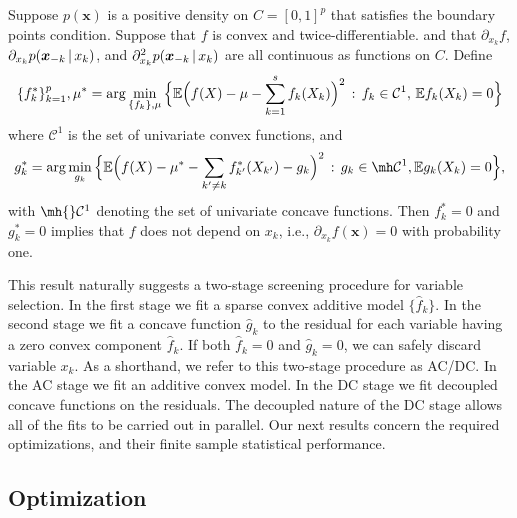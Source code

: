 \begin{stheorem}
Suppose $p(\mathbf{x})$ is a positive
density on $C=[0,1]^p$ that satisfies the boundary points
condition. Suppose that $f$ is convex and twice-differentiable.
and that $\partial_{x_k} f$, $\partial_{x_k} p( \mbox{\boldmath $x$}_{-k}
{\,|\,} x_k )$, and $\partial_{x_k}^2 p( \mbox{\boldmath $x$}_{-k} {\,|\,} x_k)$
are all continuous as functions on $C$.
Define
\begin{equation}
\{ f^*_k \}_{k=1}^p,\mu^* = \arg\min_{\{f_k\},\mu} \Big \{
{\mathbb E}\Bigl( f(X) - \mu - \sum_{k=1}^s f_k(X_k) \Bigr)^2 \,:\, f_k \in
\mathcal{C}^1, \, {\mathbb E} f_k(X_k) = 0 \Big \}
\end{equation} where $\mathcal{C}^1$ is the set of univariate convex
functions, and
\begin{equation}
g^*_k = \arg\min_{g_k} \Big\{ \E\Bigl( f(X) - \mu^* - 
\sum_{k' \neq k} f^*_{k'}(X_{k'}) - g_k \Bigr)^2 \,:\, g_k \in \mh
\mathcal{C}^1, \E g_k(X_k) = 0 \Big\},
\end{equation}
with $\mh{}\mathcal{C}^1$ denoting the set of univariate concave
functions.  Then $f^*_k = 0$ and $g^*_k = 0$ implies that $f$ does not
depend on $x_k$, i.e., $\partial_{x_k} f(\mathbf{x}) = 0$ with
probability one.
\end{stheorem}

This result naturally suggests a two-stage screening
procedure for variable selection. In the first stage we fit a sparse convex
additive model $\{\hat f_k\}$.  In the second stage we
fit a concave function $\hat g_k$ to the residual for each variable
having a zero convex component $\hat f_k$.  If both $\hat f_k = 0$ and
$\hat g_k = 0$, we can safely discard variable $x_k$.  
As a shorthand, we refer to this two-stage procedure as AC/DC.  In 
the AC stage we fit an additive convex model.  In the DC 
stage we fit decoupled concave functions on the residuals.  The
decoupled nature of the DC stage allows all of the fits to
be carried out in parallel.
Our next results concern the required optimizations, and their finite
sample statistical performance.


\subsection{Optimization}

